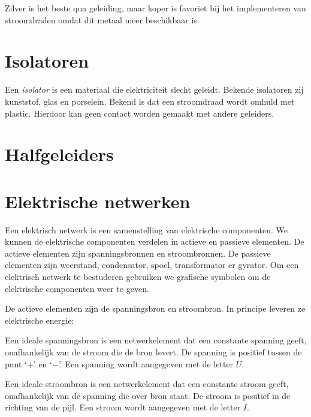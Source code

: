 Zilver is het beste qua geleiding, maar koper is favoriet bij het implementeren van stroomdraden omdat dit metaal meer beschikbaar is.


\section{Isolatoren}
Een \textsl{isolator} is een materiaal die elektriciteit slecht geleidt. Bekende isolatoren zij kunststof, glas en porselein. Bekend is dat een stroomdraad wordt omhuld met plastic. Hierdoor kan geen contact worden gemaakt met andere geleiders.


\section{Halfgeleiders}


\section{Elektrische netwerken}
Een elektrisch netwerk is een samenstelling van elektrische componenten. We kunnen de elektrische componenten verdelen in actieve en passieve elementen. De actieve elementen zijn spanningsbronnen en stroombronnen. De passieve elementen zijn weerstand, condensator, spoel, transformator er gyrator. Om een elektrisch netwerk te bestuderen gebruiken we grafische symbolen om de elektrische componenten weer te geven.

De actieve elementen zijn de spanningsbron en stroombron. In principe leveren ze elektrische energie:

\begin{minipage}{0.2\textwidth}
\centering
{}
\end{minipage}\hfill%
\begin{minipage}{0.78\textwidth}
Een ideale spanningsbron is een netwerkelement dat een constante spanning geeft, onafhankelijk van de stroom die de bron levert. De spanning is positief tussen de punt `+' en `$-$'. Een spanning wordt aangegeven met de letter $U$.
\end{minipage}

\begin{minipage}{0.2\textwidth}
\centering
{}
\end{minipage}\hfill%
\begin{minipage}{0.78\textwidth}
Een ideale stroombron is een netwerkelement dat een constante stroom geeft, onafhankelijk van de spanning die over bron staat. De stroom is positief in de richting van de pijl. Een stroom wordt aangegeven met de letter $I$.
\end{minipage}

